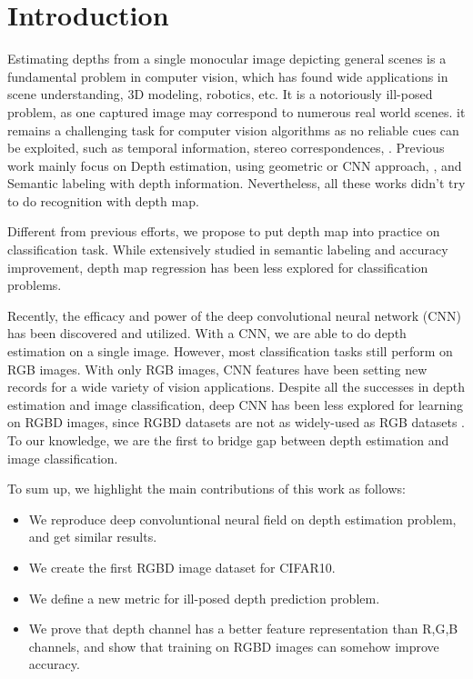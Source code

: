 \documentclass[10pt,twocolumn,letterpaper]{article}
\begin{document}
\section{Introduction}
Estimating depths from a single monocular image depicting 
general scenes is a fundamental problem in computer vision, 
which has found wide applications in scene understanding, 
3D modeling, robotics, etc.
It is a notoriously ill-posed problem, 
as one captured image may correspond to numerous real world scenes\cite{eigen2014depth}. 
it remains a challenging task for computer vision algorithms as no reliable cues can be exploited,
such as temporal information, stereo correspondences, \etc.
Previous work mainly focus on Depth estimation,
using 
geometric\cite{hedau2010thinking,gupta2010estimating,gupta2010blocks} 
or CNN\cite{liu2015deep} approach,
, and Semantic labeling\cite{ladicky2014pulling} with depth information.
Nevertheless, all these works didn't try to do recognition with depth map.

Different from previous efforts, 
we propose to put depth map into practice on classification task.
While extensively studied in semantic labeling and accuracy improvement,
depth map regression has been less explored for classification problems.

Recently, the efficacy and power of the deep
convolutional neural network (CNN) has been discovered and utilized. 
With a CNN, we are able to do depth estimation on a single image\cite{liu2015deep}.
However, most classification tasks still perform on RGB images.
With only RGB images, 
CNN features have been setting new records for a wide variety of vision applications\cite{razavian2014cnn}.
Despite all the successes in depth estimation and image classification,
deep CNN has been less explored for learning on RGBD images, since RGBD datasets are not as widely-used as RGB datasets .
To our knowledge, we are the first to bridge gap between depth estimation and 
image classification.

To sum up, we highlight the main contributions of this work as follows:
\begin{itemize}
\vspace{-.12cm} \item 
We reproduce deep convoluntional neural field on depth estimation problem, 
and get similar results.
\vspace{-.12cm} \item
We create the first RGBD image dataset for CIFAR10.
\vspace{-.12cm} \item 
We define a new metric for ill-posed depth prediction problem.
\vspace{-.12cm} \item 
We prove that depth channel has a better feature representation than R,G,B channels,
and show that training on RGBD images can somehow improve accuracy.
\end{itemize}
\end{document}
